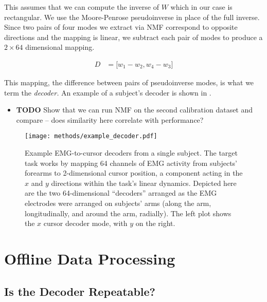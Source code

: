 \documentclass[../main.tex]{subfiles}
\begin{document}
This assumes that we can compute the inverse of $W$ which in our case is rectangular. We use the Moore-Penrose pseudoinverse in place of the full inverse. Since two pairs of four modes we extract via NMF correspond to opposite directions and the mapping is linear, we subtract each pair of modes to produce a $2\times{64}$ dimensional mapping.

\begin{align}
  D &= \lbrack w_1 - w_2, w_4 - w_3 \rbrack
\end{align}

This mapping, the difference between pairs of pseudoinverse modes, is what we term the \textit{decoder.} An example of a subject's decoder is shown in .

\begin{itemize}
  \item \textbf{TODO} Show that we can run NMF on the second calibration dataset and compare – does similarity here correlate with performance?
\end{itemize}

\begin{figure}[H]%
  \centering
  \texttt{[image: methods/example\_decoder.pdf]}
  \caption[Example subject decoder]{Example EMG-to-cursor decoders from a single subject. The target task works by mapping 64 channels of EMG activity from subjects' forearms to 2-dimensional cursor position, a component acting in the $x$ and $y$ directions within the task's linear dynamics. Depicted here are the two 64-dimensional ``decoders'' arranged as the EMG electrodes were arranged on subjects' arms (along the arm, longitudinally, and around the arm, radially). The left plot shows the $x$ cursor decoder mode, with $y$ on the right.}\label{fig:example_decoder}
\end{figure}






\section{Offline Data Processing}

\subsection{Is the Decoder Repeatable? \rbrack}
\end{document}
